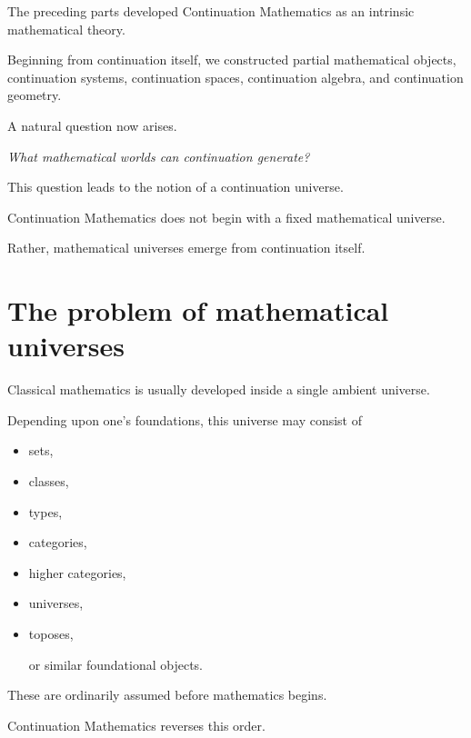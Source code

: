 \documentclass[13pt,openany]{book}
\theoremstyle{plain}
\theoremstyle{definition}
\begin{document}
The preceding parts developed Continuation Mathematics as an intrinsic mathematical theory.

Beginning from continuation itself, we constructed partial mathematical objects, continuation systems, continuation spaces, continuation algebra, and continuation geometry.

A natural question now arises.

\begin{center}
\emph{What mathematical worlds can continuation generate?}
\end{center}

This question leads to the notion of a continuation universe.

Continuation Mathematics does not begin with a fixed mathematical universe.

Rather, mathematical universes emerge from continuation itself.


\section{The problem of mathematical universes}

Classical mathematics is usually developed inside a single ambient universe.

Depending upon one's foundations, this universe may consist of

\begin{itemize}

\item sets,

\item classes,

\item types,

\item categories,

\item higher categories,

\item universes,

\item toposes,

or similar foundational objects.

\end{itemize}

These are ordinarily assumed before mathematics begins.

Continuation Mathematics reverses this order.
\end{document}
